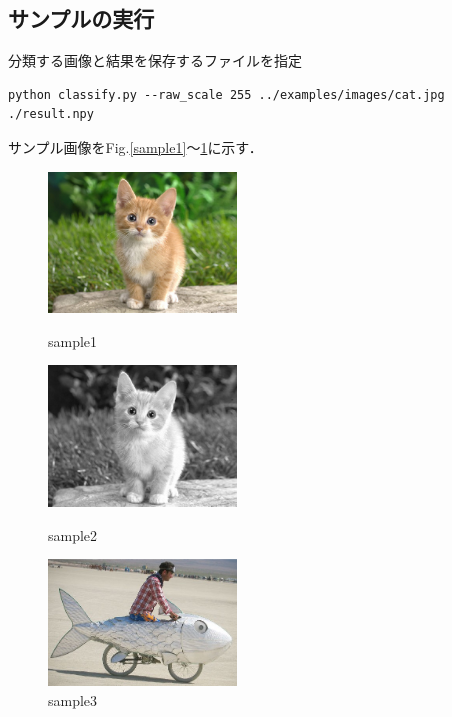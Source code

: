 \documentclass[a4paper,10pt]{jsarticle}
\begin{document}
\subsection{サンプルの実行}
分類する画像と結果を保存するファイルを指定
\begin{lstlisting}[basicstyle=\ttfamily\footnotesize, frame=single]
python classify.py --raw_scale 255 ../examples/images/cat.jpg ./result.npy
\end{lstlisting}
サンプル画像をFig.\ref{sample1}〜\ref{sample3}に示す．


\begin{figure}[t]
 \begin{minipage}{0.33\hsize}
  \begin{center}
   \includegraphics[width=50mm]{../02nd/fig/cat.eps}
  \end{center}
  \caption{sample1}
  \label{sample1}
 \end{minipage}
 \begin{minipage}{0.33\hsize}
 \begin{center}
  \includegraphics[width=50mm]{../02nd/fig/cat_gray.eps}
 \end{center}
  \caption{sample2}
  \label{sample2}
 \end{minipage}
 \begin{minipage}{0.33\hsize}
 \begin{center}
  \includegraphics[width=50mm]{../02nd/fig/fish-bike.eps}
 \end{center}
  \caption{sample3}
  \label{sample3}
 \end{minipage}
\end{figure}
\end{document}
